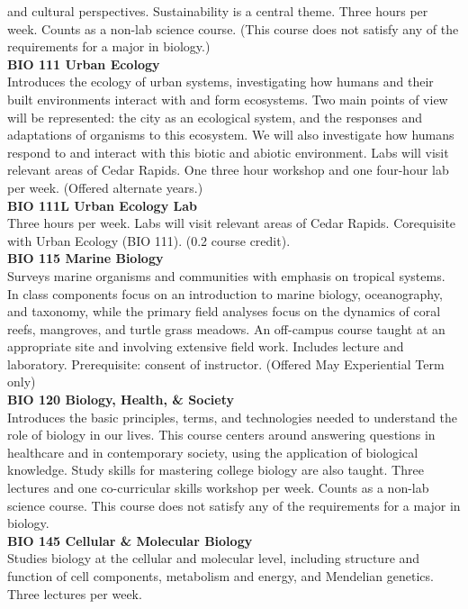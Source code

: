 \documentclass[
  letterpaper,
]{scrbook}
\begin{document}
and cultural perspectives. Sustainability is a central theme. Three
hours per week. Counts as a non-lab science course. (This course does
not satisfy any of the requirements for a major in biology.)\\
\textbf{BIO 111 Urban Ecology}\\
Introduces the ecology of urban systems, investigating how humans and
their built environments interact with and form ecosystems. Two main
points of view will be represented: the city as an ecological system,
and the responses and adaptations of organisms to this ecosystem. We
will also investigate how humans respond to and interact with this
biotic and abiotic environment. Labs will visit relevant areas of Cedar
Rapids. One three hour workshop and one four-hour lab per week. (Offered
alternate years.)\\
\textbf{BIO 111L Urban Ecology Lab}\\
Three hours per week. Labs will visit relevant areas of Cedar Rapids.
Corequisite with Urban Ecology (BIO 111). (0.2 course credit).\\
\textbf{BIO 115 Marine Biology}\\
Surveys marine organisms and communities with emphasis on tropical
systems. In class components focus on an introduction to marine biology,
oceanography, and taxonomy, while the primary field analyses focus on
the dynamics of coral reefs, mangroves, and turtle grass meadows. An
off-campus course taught at an appropriate site and involving extensive
field work. Includes lecture and laboratory. Prerequisite: consent of
instructor. (Offered May Experiential Term only)\\
\textbf{BIO 120 Biology, Health, \& Society}\\
Introduces the basic principles, terms, and technologies needed to
understand the role of biology in our lives. This course centers around
answering questions in healthcare and in contemporary society, using the
application of biological knowledge. Study skills for mastering college
biology are also taught. Three lectures and one co-curricular skills
workshop per week. Counts as a non-lab science course. This course does
not satisfy any of the requirements for a major in biology.\\
\textbf{BIO 145 Cellular \& Molecular Biology}\\
Studies biology at the cellular and molecular level, including structure
and function of cell components, metabolism and energy, and Mendelian
genetics. Three lectures per week.\\
\end{document}
